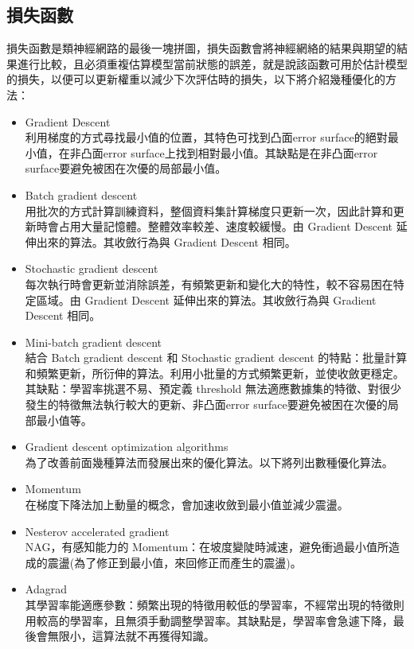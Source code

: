 \documentclass[14pt,a4paper]{report}  %
\begin{document}
\subsection{損失函數}
損失函數是類神經網路的最後一塊拼圖，損失函數會將神經網絡的結果與期望的結果進行比較，且必須重複估算模型當前狀態的誤差，就是說該函數可用於估計模型的損失，以便可以更新權重以減少下次評估時的損失，以下將介紹幾種優化的方法：\\

\begin{itemize}
\item Gradient Descent\\
利用梯度的方式尋找最小值的位置，其特色可找到凸面error surface的絕對最小值，在非凸面error surface上找到相對最小值。其缺點是在非凸面error surface要避免被困在次優的局部最小值。
\item Batch gradient descent\\
用批次的方式計算訓練資料，整個資料集計算梯度只更新一次，因此計算和更新時會占用大量記憶體。整體效率較差、速度較緩慢。由 Gradient Descent 延伸出來的算法。其收斂行為與 Gradient Descent 相同。
\item Stochastic gradient descent\\
每次執行時會更新並消除誤差，有頻繁更新和變化大的特性，較不容易困在特定區域。由 Gradient Descent 延伸出來的算法。其收斂行為與 Gradient Descent 相同。
\item Mini-batch gradient descent\\
結合 Batch gradient descent 和 Stochastic gradient descent 的特點：批量計算和頻繁更新，所衍伸的算法。利用小批量的方式頻繁更新，並使收斂更穩定。其缺點：學習率挑選不易、預定義 threshold 無法適應數據集的特徵、對很少發生的特徵無法執行較大的更新、非凸面error surface要避免被困在次優的局部最小值等。
\item Gradient descent optimization algorithms\\
為了改善前面幾種算法而發展出來的優化算法。以下將列出數種優化算法。
\item Momentum\\
在梯度下降法加上動量的概念，會加速收斂到最小值並減少震盪。
\item Nesterov accelerated gradient\\
NAG，有感知能力的 Momentum：在坡度變陡時減速，避免衝過最小值所造成的震盪(為了修正到最小值，來回修正而產生的震盪)。
\item Adagrad\\
其學習率能適應參數：頻繁出現的特徵用較低的學習率，不經常出現的特徵則用較高的學習率，且無須手動調整學習率。其缺點是，學習率會急遽下降，最後會無限小，這算法就不再獲得知識。

\end{itemize}
\end{document}
